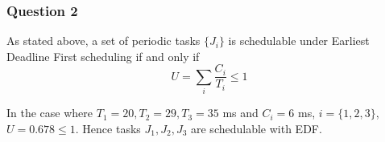 \subsubsection{Question 2}

As stated above, a set of periodic tasks $\{J_i\}$ is schedulable under Earliest
Deadline First scheduling if and only if $$U = \sum_{i} \dfrac{C_i}{T_i} \leq 1$$

In the case where $T_1 = 20, T_2 = 29, T_3 = 35$ ms and $C_i = 6$ ms,
$i=\{1,2,3\}$, $U=0.678 \leq 1$. Hence tasks $J_1, J_2, J_3$ are schedulable
with EDF.


